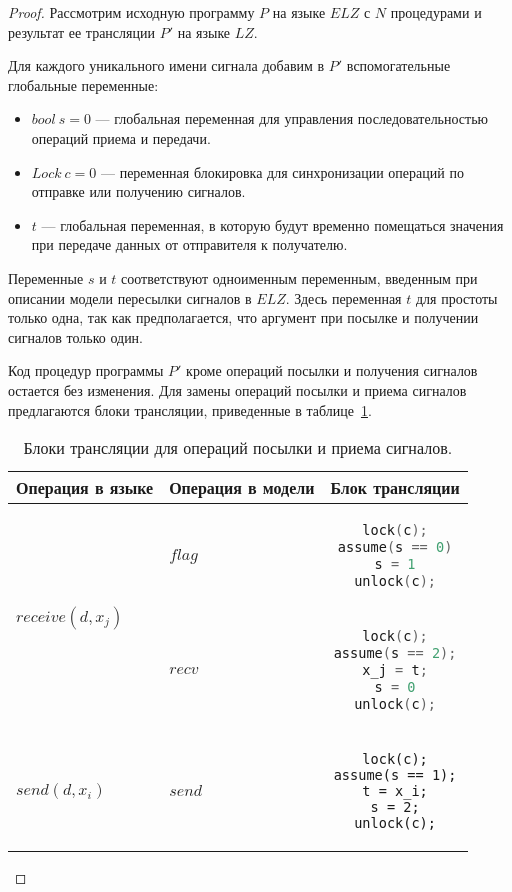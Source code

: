 \begin{proof}
Рассмотрим исходную программу $P$ на языке $ELZ$ с $N$ процедурами и результат ее трансляции $P'$ на языке $LZ$. 

Для каждого уникального имени сигнала добавим в $P'$  вспомогательные глобальные переменные:
\begin{itemize}
    \item $bool~s = 0$ --- глобальная переменная для управления последовательностью операций приема и передачи.
    \item $Lock~c = 0$ --- переменная блокировка для синхронизации операций по отправке или получению сигналов.
    \item $t$ --- глобальная переменная, в которую будут временно помещаться значения при передаче данных от отправителя к получателю.
\end{itemize}

Переменные $s$ и $t$ соответствуют одноименным переменным, введенным при описании модели пересылки сигналов в $ELZ$.
Здесь переменная $t$ для простоты только одна, так как предполагается, что аргумент при посылке и получении сигналов только один.

Код процедур программы $P'$ кроме операций посылки и получения сигналов остается без изменения.
Для замены операций посылки и приема сигналов предлагаются блоки трансляции, приведенные в таблице~\ref{table:translation}.

\begin{table}
\centering
\begin{tabular}{ | l | l | c | }
\hline
Операция в языке & Операция в модели & Блок трансляции \\
\hline
\multirow{2}{*}[-3em]{$receive(d, x_j)$} & $flag$ & 
\begin{lstlisting}[language=C]
lock(c);
assume(s == 0)
s = 1
unlock(c);
\end{lstlisting} \\
\cline{2-3}
& $recv$ & \begin{lstlisting}[language=C]
lock(c);
assume(s == 2);
x_j = t;
s = 0
unlock(c);
\end{lstlisting} \\
\hline
$send(d, x_i)$ & $send$ & 
\begin{lstlisting}
lock(c);
assume(s == 1);
t = x_i;
s = 2;
unlock(c);
\end{lstlisting} \\
\hline
\end{tabular}
\caption{Блоки трансляции для операций посылки и приема сигналов.}
\label{table:translation}
\end{table}


\end{proof}
